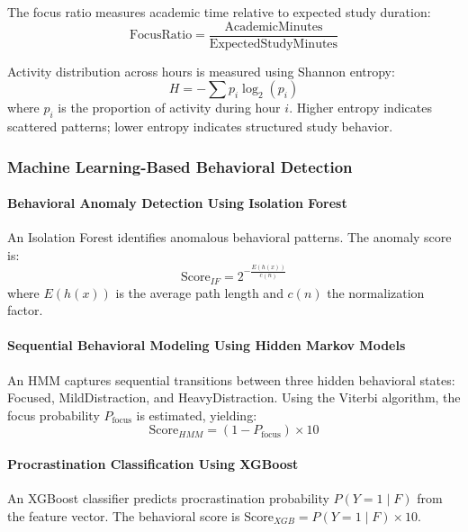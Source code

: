 \documentclass[conference]{IEEEtran}
\begin{document}
The focus ratio measures academic time relative to expected study duration:
\begin{equation}
\text{FocusRatio} = \frac{\text{AcademicMinutes}}{\text{ExpectedStudyMinutes}}
\label{eq_focus_ratio}
\end{equation}

Activity distribution across hours is measured using Shannon entropy:
\begin{equation}
H = -\sum p_i \log_2(p_i)
\label{eq_entropy}
\end{equation}
where $p_i$ is the proportion of activity during hour $i$. Higher entropy indicates scattered patterns; lower entropy indicates structured study behavior.

\subsubsection{Machine Learning-Based Behavioral Detection}

\paragraph{Behavioral Anomaly Detection Using Isolation Forest}
An Isolation Forest identifies anomalous behavioral patterns. The anomaly score is:
\begin{equation}
\text{Score}_{IF} = 2^{-\frac{E(h(x))}{c(n)}}
\label{eq_isolation_forest}
\end{equation}
where $E(h(x))$ is the average path length and $c(n)$ the normalization factor.

\paragraph{Sequential Behavioral Modeling Using Hidden Markov Models}
An HMM captures sequential transitions between three hidden behavioral states: Focused, MildDistraction, and HeavyDistraction. Using the Viterbi algorithm, the focus probability $P_{\text{focus}}$ is estimated, yielding:
\begin{equation}
\text{Score}_{HMM} = (1 - P_{\text{focus}}) \times 10
\label{eq_hmm_score}
\end{equation}

\paragraph{Procrastination Classification Using XGBoost}
An XGBoost classifier predicts procrastination probability $P(Y = 1 \mid F)$ from the feature vector. The behavioral score is $\text{Score}_{XGB} = P(Y = 1 \mid F) \times 10$.
\end{document}
